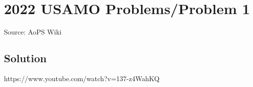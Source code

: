 \documentclass[12pt]{article}
\begin{document}
\section*{{2022 USAMO Problems/Problem 1}}
Source: AoPS Wiki

\subsection*{Solution}
https://www.youtube.com/watch?v=137-z4WahKQ
\end{document}
